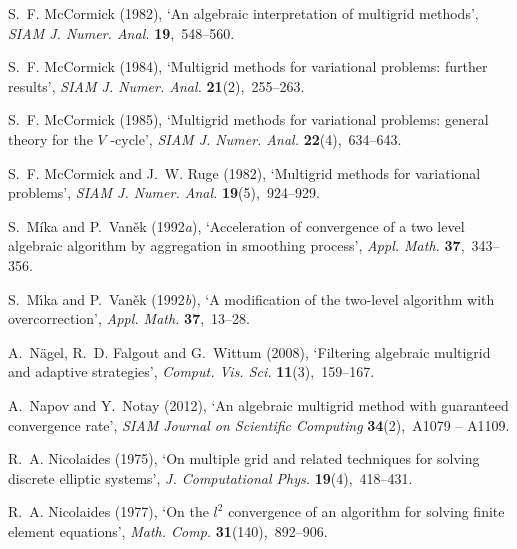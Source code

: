 \documentclass[12pt]{acta_2011xz}
\begin{document}
\begin{thebibliography}{xx}
S.~F. McCormick  (1982), `An algebraic interpretation of multigrid methods',
  {\em SIAM J. Numer. Anal.} {\bf 19},~548--560.

S.~F. McCormick  (1984), `Multigrid methods for variational problems: further
  results', {\em SIAM J. Numer. Anal.} {\bf 21}(2),~255--263.

S.~F. McCormick  (1985), `Multigrid methods for variational problems: general
  theory for the {        $V$        }-cycle', {\em SIAM J. Numer. Anal.} {\bf
  22}(4),~634--643.

S.~F. McCormick and J.~W. Ruge  (1982), `Multigrid methods for variational
  problems', {\em SIAM J. Numer. Anal.} {\bf 19}(5),~924--929.

S.~M\'{i}ka and P.~Van{\v{e}}k  (1992{\em a}), `Acceleration of convergence of
  a two level algebraic algorithm by aggregation in smoothing process', {\em
  Appl. Math.} {\bf 37},~343--356.

S.~M{\'\i}ka and P.~Van{\v{e}}k  (1992{\em b}), `A modification of the
  two-level algorithm with overcorrection', {\em Appl. Math.} {\bf 37},~13--28.

A.~N{\"{a}}gel, R.~D. Falgout and G.~Wittum  (2008), `Filtering algebraic
  multigrid and adaptive strategies', {\em Comput. Vis. Sci.} {\bf
  11}(3),~159--167.

A.~Napov and Y.~Notay  (2012), `{An algebraic multigrid method with guaranteed
  convergence rate}', {\em SIAM Journal on Scientific Computing} {\bf
  34}(2),~A1079 -- A1109.

R.~A. Nicolaides  (1975), `On multiple grid and related techniques for solving
  discrete elliptic systems', {\em J. Computational Phys.} {\bf
  19}(4),~418--431.

R.~A. Nicolaides  (1977), `On the {        $l^{2}$        } convergence of an algorithm for
  solving finite element equations', {\em Math. Comp.} {\bf 31}(140),~892--906.


\end{thebibliography}
\end{document}
